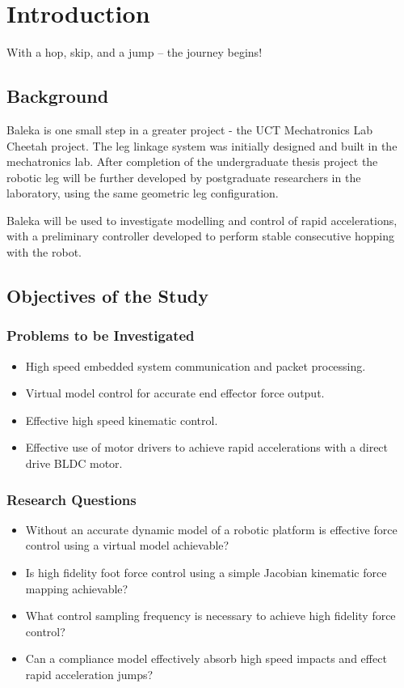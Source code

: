 \chapter{Introduction}
\label{chap:intro}

With a hop, skip, and a jump -- the journey begins!

\section{Background}
Baleka is one small step in a greater project - the UCT Mechatronics Lab Cheetah project. The leg linkage system was initially designed and built in the mechatronics lab. After completion of the undergraduate thesis project the robotic leg will be further developed by postgraduate researchers in the laboratory, using the same geometric leg configuration. 

Baleka will be used to investigate modelling and control of rapid accelerations, with a preliminary controller developed to perform stable consecutive hopping with the robot.

\section{Objectives of the Study}
\subsection{Problems to be Investigated}
\begin{itemize}
\item High speed embedded system communication and packet processing.
\item Virtual model control for accurate end effector force output. 
\item Effective high speed kinematic control.
\item Effective use of motor drivers to achieve rapid accelerations with a direct drive BLDC motor.
\end{itemize}

\subsection{Research Questions}
\begin{itemize}
\item Without an accurate dynamic model of a robotic platform is effective force control using a virtual model achievable?
\item Is high fidelity foot force control using a simple Jacobian kinematic force mapping achievable?
\item What control sampling frequency is necessary to achieve high fidelity force control? 
\item Can a compliance model effectively absorb high speed impacts and effect rapid acceleration jumps?
\end{itemize}

